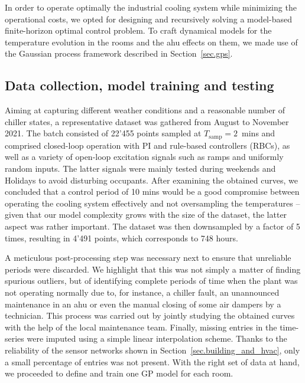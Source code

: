 In order to operate optimally the industrial cooling system while minimizing the operational costs, we opted for designing and recursively solving a model-based finite-horizon optimal control problem. To craft dynamical models for the temperature evolution in the rooms and the \ac{ahu} effects on them, we made use of the Gaussian process framework described in Section~\ref{sec.gps}.

\subsection{Data collection, model training and testing}
\label{sec.ModelTrainingAndTesting}

Aiming at capturing different weather conditions and a reasonable number of chiller states, a representative dataset was gathered from August to November 2021. The batch consisted of 22'455 points sampled at $T_\text{samp} = 2\,$ mins and comprised closed-loop operation with PI and rule-based controllers (RBCs), as well as a variety of open-loop excitation signals such as ramps and uniformly random inputs. The latter signals were mainly tested during weekends and Holidays to avoid disturbing occupants. After examining the obtained curves, we concluded that a control period of 10 mins would be a good compromise between operating the cooling system effectively and not oversampling the temperatures -- given that our model complexity grows with the size of the dataset, the latter aspect was rather important. The dataset was then downsampled by a factor of 5 times, resulting in 4'491 points, which corresponds to 748 hours. 

A meticulous post-processing step was necessary next to ensure that unreliable periods were discarded. We highlight that this was not simply a matter of finding spurious outliers, but of identifying complete periods of time when the plant was not operating normally due to, for instance, a chiller fault, an unannounced maintenance in an \ac{ahu} or even the manual closing of some air dampers by a technician. This process was carried out by jointly studying the obtained curves with the help of the local maintenance team. Finally, missing entries in the time-series were imputed using a simple linear interpolation scheme. Thanks to the reliability of the sensor networks shown in Section~\ref{sec.building_and_hvac}, only a small percentage of entries was not present. With the right set of data at hand, we proceeded to define and train one GP model for each room. 

